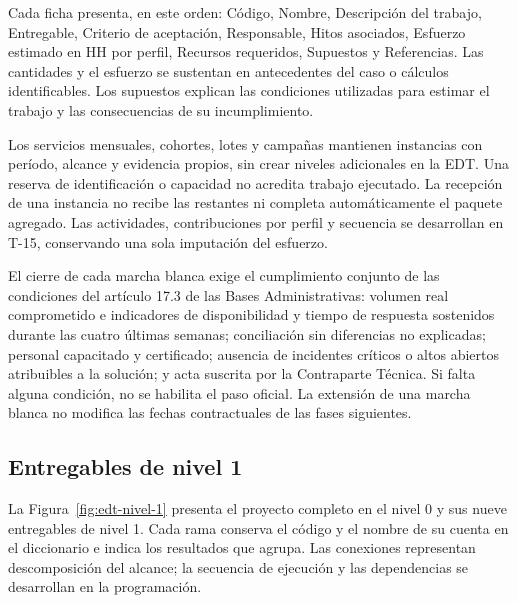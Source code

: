 Cada ficha presenta, en este orden: Código, Nombre, Descripción del trabajo, Entregable, Criterio de aceptación, Responsable, Hitos asociados, Esfuerzo estimado en HH por perfil, Recursos requeridos, Supuestos y Referencias. Las cantidades y el esfuerzo se sustentan en antecedentes del caso o cálculos identificables. Los supuestos explican las condiciones utilizadas para estimar el trabajo y las consecuencias de su incumplimiento.

Los servicios mensuales, cohortes, lotes y campañas mantienen instancias con período, alcance y evidencia propios, sin crear niveles adicionales en la EDT. Una reserva de identificación o capacidad no acredita trabajo ejecutado. La recepción de una instancia no recibe las restantes ni completa automáticamente el paquete agregado. Las actividades, contribuciones por perfil y secuencia se desarrollan en T-15, conservando una sola imputación del esfuerzo.

El cierre de cada marcha blanca exige el cumplimiento conjunto de las condiciones del artículo 17.3 de las Bases Administrativas: volumen real comprometido e indicadores de disponibilidad y tiempo de respuesta sostenidos durante las cuatro últimas semanas; conciliación sin diferencias no explicadas; personal capacitado y certificado; ausencia de incidentes críticos o altos abiertos atribuibles a la solución; y acta suscrita por la Contraparte Técnica. Si falta alguna condición, no se habilita el paso oficial. La extensión de una marcha blanca no modifica las fechas contractuales de las fases siguientes.

\subsection{Entregables de nivel 1}
\label{subsec:edt-nivel-1}

La Figura~\ref{fig:edt-nivel-1} presenta el proyecto completo en el nivel 0 y sus nueve entregables de nivel 1. Cada rama conserva el código y el nombre de su cuenta en el diccionario e indica los resultados que agrupa. Las conexiones representan descomposición del alcance; la secuencia de ejecución y las dependencias se desarrollan en la programación.

